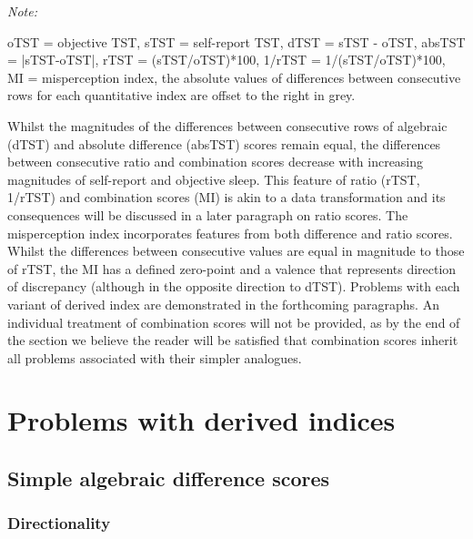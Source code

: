 \documentclass[
]{article}
\begin{document}
\begin{table}[!h]
\begin{threeparttable}
\begin{tabular}[t]
\addlinespace
\bottomrule
\end{tabular}
\begin{tablenotes}[para]
\item \textit{Note: } 
\item oTST = objective TST, sTST = self-report TST, dTST = sTST - oTST, absTST = |sTST-oTST|, rTST = (sTST/oTST)*100, 1/rTST = 1/(sTST/oTST)*100, MI = misperception index, the absolute values of differences between consecutive rows for each quantitative index are offset to the right in grey.
\end{tablenotes}
\end{threeparttable}
\end{table}

Whilst the magnitudes of the differences between consecutive rows of algebraic (dTST) and absolute difference (absTST) scores remain equal, the differences between consecutive ratio and combination scores decrease with increasing magnitudes of self-report and objective sleep. This feature of ratio (rTST, 1/rTST) and combination scores (MI) is akin to a data transformation and its consequences will be discussed in a later paragraph on ratio scores. The misperception index incorporates features from both difference and ratio scores. Whilst the differences between consecutive values are equal in magnitude to those of rTST, the MI has a defined zero-point and a valence that represents direction of discrepancy (although in the opposite direction to dTST). Problems with each variant of derived index are demonstrated in the forthcoming paragraphs. An individual treatment of combination scores will not be provided, as by the end of the section we believe the reader will be satisfied that combination scores inherit all problems associated with their simpler analogues.

\section{Problems with derived indices}\label{problems-with-derived-indices}

\subsection{Simple algebraic difference scores}\label{simple-algebraic-difference-scores}

\subsubsection{Directionality}\label{directionality}
\end{document}
